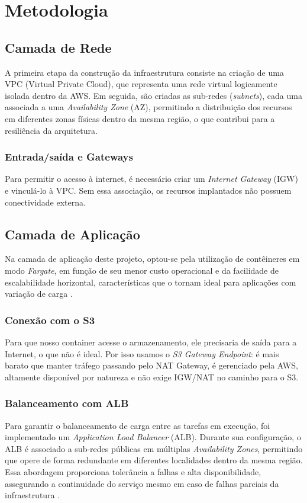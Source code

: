 \chapter{Metodologia}
\label{sec:metod}

\section{Camada de Rede}
A primeira etapa da construção da infraestrutura consiste na criação de uma VPC (Virtual Private Cloud), que representa uma rede virtual logicamente isolada dentro da AWS. Em seguida, são criadas as sub-redes (\textit{subnets}), cada uma associada a uma \textit{Availability Zone} (AZ), permitindo a distribuição dos recursos em diferentes zonas físicas dentro da mesma região, o que contribui para a resiliência da arquitetura.

\subsection{Entrada/saída e Gateways}
Para permitir o acesso à internet, é necessário criar um \textit{Internet Gateway} (IGW) e vinculá-lo à VPC. Sem essa associação, os recursos implantados não possuem conectividade externa.

\section{Camada de Aplicação}
Na camada de aplicação deste projeto, optou-se pela utilização de contêineres em modo \textit{Fargate}, em função de seu menor custo operacional e da facilidade de escalabilidade horizontal, características que o tornam ideal para aplicações com variação de carga \cite{redhat2024containers}.

\subsection{Conexão com o S3}
Para que nosso container acesse o armazenamento, ele precisaria de saída para a Internet, o que não é ideal. Por isso usamos o \textit{S3 Gateway Endpoint}: é mais barato que manter tráfego passando pelo NAT Gateway, é gerenciado pela AWS, altamente disponível por natureza e não exige IGW/NAT no caminho para o S3\cite{awsendpoint}.


\subsection{Balanceamento com ALB}
Para garantir o balanceamento de carga entre as tarefas em execução, foi implementado um \textit{Application Load Balancer} (ALB). Durante sua configuração, o ALB é associado a sub-redes públicas em múltiplas \textit{Availability Zones}, permitindo que opere de forma redundante em diferentes localidades dentro da mesma região. Essa abordagem proporciona tolerância a falhas e alta disponibilidade, assegurando a continuidade do serviço mesmo em caso de falhas parciais da infraestrutura \cite{aws2024alb}.

